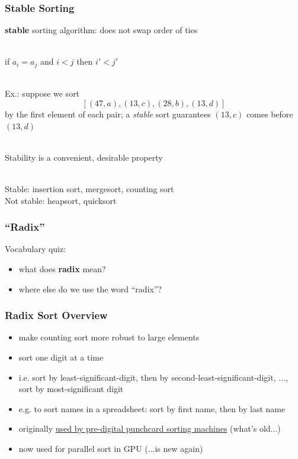 \documentclass{beamer}
\newcommand{\stanza}{ \\~\ }
\begin{document}
\begin{frame} \frametitle{Stable Sorting}
\textbf{stable} sorting algorithm: does not swap order of ties \stanza

if $a_i=a_j$ and $i<j$ then $i' < j'$ \stanza

Ex.: suppose we sort
\[ [(47, a), (13, c), (28, b), (13, d)] \]
by the first element of each pair; a \emph{stable} sort guarantees $(13, c)$
comes before $(13, d)$ \stanza

Stability is a convenient, desirable property \stanza

Stable: insertion sort, mergesort, counting sort \\
Not stable: heapsort, quicksort
\end{frame}

\begin{frame} \frametitle{``Radix''}
Vocabulary quiz:
\begin{itemize}
  \item what does \textbf{radix} mean?
  \item where else do we use the word ``radix''?
\end{itemize}
\end{frame}

\begin{frame} \frametitle{Radix Sort Overview}
\begin{itemize}
  \item make counting sort more robust to large elements
  \item sort one digit at a time
  \item i.e. sort by least-significant-digit, then by second-least-significant-digit, $\ldots$,
    sort by most-significant digit
  \item e.g. to sort names in a spreadsheet: sort by first name, then by last name
  \item originally
  \href{https://en.wikipedia.org/wiki/Radix_sort\#/media/File:SEACComputer_038.jpg}{used by pre-digital punchcard sorting machines}
    (what's old...)
  \item now used for parallel sort in GPU (...is new again)
\end{itemize}
\end{frame}
\end{document}
